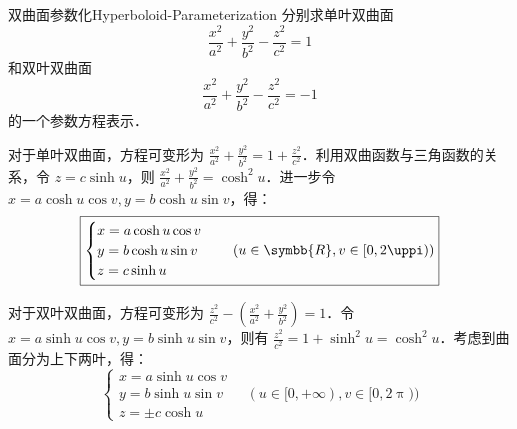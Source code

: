 \begin{problem}{双曲面参数化}{Hyperboloid-Parameterization}
    分别求单叶双曲面
    \begin{equation}
        \frac{x^2}{a^2} + \frac{y^2}{b^2} - \frac{z^2}{c^2} = 1
    \end{equation}
    和双叶双曲面
    \begin{equation}
        \frac{x^2}{a^2} + \frac{y^2}{b^2} - \frac{z^2}{c^2} = -1
    \end{equation}
    的一个参数方程表示．
\end{problem}

\begin{solution}

    对于单叶双曲面，方程可变形为 $\frac{x^2}{a^2} + \frac{y^2}{b^2} = 1 + \frac{z^2}{c^2}$．利用双曲函数与三角函数的关系，令 $z = c \sinh u$，则 $\frac{x^2}{a^2} + \frac{y^2}{b^2} = \cosh^2 u$．进一步令 $x = a \cosh u \cos v, y = b \cosh u \sin v$，得：
    \begin{equation}
        \boxed{\begin{cases} x = a \cosh u \cos v \\ y = b \cosh u \sin v \\ z = c \sinh u \end{cases} \quad (u \in \symbb{R}, v \in [0, 2\uppi))}
    \end{equation}


    对于双叶双曲面，方程可变形为 $\frac{z^2}{c^2} - \left( \frac{x^2}{a^2} + \frac{y^2}{b^2} \right) = 1$．令 $x = a \sinh u \cos v, y = b \sinh u \sin v$，则有 $\frac{z^2}{c^2} = 1 + \sinh^2 u = \cosh^2 u$．考虑到曲面分为上下两叶，得：
    \begin{equation}
        \boxed{\begin{cases} x = a \sinh u \cos v \\ y = b \sinh u \sin v \\ z = \pm c \cosh u \end{cases} \quad (u \in [0, +\infty), v \in [0, 2\uppi))}
    \end{equation}
\end{solution}

\endinput
